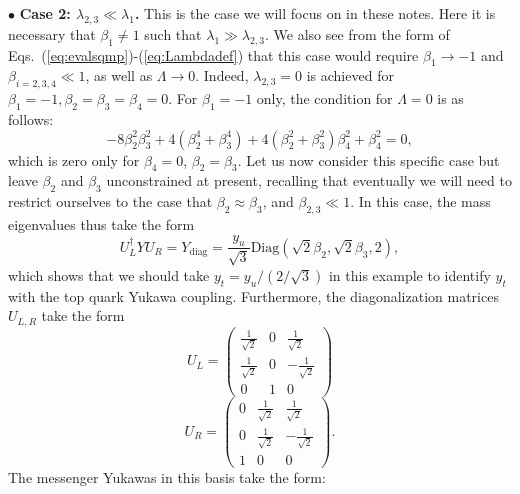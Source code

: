 \documentclass[12pt]{article}
\begin{document}
\noindent $\bullet$ {\bf Case 2: $\lambda_{2,3}\ll \lambda_1$.}  This is the case we will focus on in these notes.  Here it is necessary that $\beta_1\neq 1$ such that $\lambda_1\gg \lambda_{2,3}$.  We also see from the form of Eqs.~(\ref{eq:evalsqmp})-(\ref{eq:Lambdadef}) that this case would require $\beta_1\rightarrow -1$ and $\beta_{i=2,3,4}\ll 1$, as well as $\Lambda \rightarrow 0$.  Indeed, $\lambda_{2,3}=0$ is achieved for $\beta_1=-1,\beta_2=\beta_3=\beta_4=0$.  
For $\beta_1=-1$ only, the condition for $\Lambda=0$ is as follows:
\begin{equation}
-8 \beta_2^2 \beta_3^2+4(\beta_2^4+\beta_3^4)+4(\beta_2^2+\beta_3^2)\beta_4^2+\beta_4^2=0,
\end{equation}
which is zero only for $\beta_4=0$, $\beta_2=\beta_3$.
Let us now consider this specific case but leave $\beta_2$ and $\beta_3$ unconstrained at present, recalling that eventually we will need to restrict ourselves to the case that $\beta_2\approx \beta_3$, and $\beta_{2,3}\ll 1$.  In this case, the mass eigenvalues thus take the form
\begin{equation}
U_L^\dagger Y U_R= Y_\text{diag}=\frac{y_u}{\sqrt{3}}\text{Diag}(\sqrt{2}\beta_2, \sqrt{2}\beta_3,2),
\end{equation}
which shows that we should take $y_t =y_u/(2/\sqrt{3})$ in this example to identify $y_t$ with the top quark Yukawa coupling.  Furthermore, the diagonalization matrices $U_{L,R}$ take the form
\begin{equation}
U_L=\left (\begin{array}{ccc} \frac{1}{\sqrt{2}} & 0 & \frac{1}{\sqrt{2}} \\ \frac{1}{\sqrt{2}} & 0 & -\frac{1}{\sqrt{2}} \\ 0& 1 & 0 
\end{array} \right )
\end{equation}
\begin{equation}
U_R=\left (\begin{array}{ccc} 0& \frac{1}{\sqrt{2}} &  \frac{1}{\sqrt{2}} \\ 0 & \frac{1}{\sqrt{2}} &  -\frac{1}{\sqrt{2}} \\ 1 & 0 & 0 
\end{array} \right ).
\end{equation}
The messenger Yukawas in this basis take the form:
\end{document}

